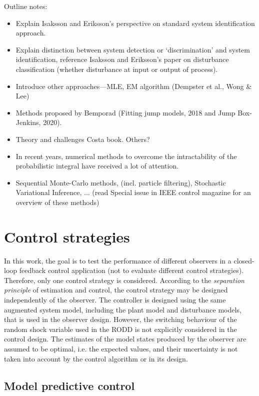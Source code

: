 Outline notes:
\begin{itemize}
	\item Explain Isaksson and Eriksson's perspective on standard system identification approach.
	\item Explain distinction between system detection or `discrimination' and system identification, reference Isaksson and Eriksson's paper on disturbance classification (whether disturbance at input or output of process).
	\item Introduce other approaches—MLE, EM algorithm (Dempster et al., Wong \& Lee)
	\item Methods proposed by Bemporad (Fitting jump models, 2018 and Jump Box-Jenkins, 2020).
	\item Theory and challenges Costa book. Others?
	\item In recent years, numerical methods to overcome the intractability of the probabilistic integral have received a lot of attention.
	\item Sequential Monte-Carlo methods, (incl. particle filtering), Stochastic Variational Inference, ... (read Special issue in IEEE control magazine for an overview of these methods)
\end{itemize}


\section{Control strategies}

In this work, the goal is to test the performance of different observers in a closed-loop feedback control application (not to evaluate different control strategies). Therefore, only one control strategy is considered. According to the \textit{separation principle} of estimation and control, the control strategy may be designed independently of the observer. The controller is designed using the same augmented system model, including the plant model and disturbance models, that is used in the observer design. However, the switching behaviour of the random shock variable used in the RODD is not explicitly considered in the control design. The estimates of the model states produced by the observer are assumed to be optimal, i.e. the expected values, and their uncertainty is not taken into account by the control algorithm or in its design.


\subsection{Model predictive control}

